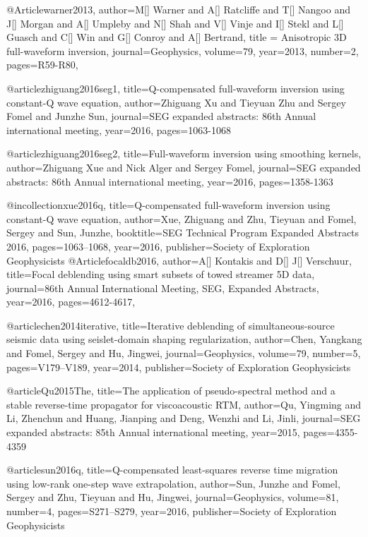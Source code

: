{@Article{warner2013,
  author={M[] Warner and A[] Ratcliffe and T[] Nangoo and J[] Morgan and A[] Umpleby and N[] Shah and V[] Vinje and I[] Stekl and L[] Guasch and C[] Win and G[] Conroy and A[] Bertrand},
  title = {Anisotropic 3{D} full-waveform inversion},
  journal={Geophysics},
  volume=79,
  year=2013,
  number=2,
  pages={R59-R80},
}


@article{zhiguang2016seg1,
  title={Q-compensated full-waveform inversion using constant-Q wave equation},
  author={Zhiguang Xu and Tieyuan Zhu and Sergey Fomel and Junzhe Sun},
  journal={SEG expanded abstracts: 86th Annual international meeting},
  year={2016},
  pages={1063-1068}
}

@article{zhiguang2016seg2,
  title={Full-waveform inversion using smoothing kernels},
  author={Zhiguang Xue and Nick Alger and Sergey Fomel},
  journal={SEG expanded abstracts: 86th Annual international meeting},
  year={2016},
  pages={1358-1363}
}

@incollection{xue2016q,
  title={Q-compensated full-waveform inversion using constant-Q wave equation},
  author={Xue, Zhiguang and Zhu, Tieyuan and Fomel, Sergey and Sun, Junzhe},
  booktitle={SEG Technical Program Expanded Abstracts 2016},
  pages={1063--1068},
  year={2016},
  publisher={Society of Exploration Geophysicists}
}
@Article{focaldb2016,
  author={A[] Kontakis and D[] J[] Verschuur},
  title={Focal deblending using smart subsets of towed streamer 5D data},
  journal={86th Annual International Meeting, SEG, Expanded Abstracts},
  year=2016,
  pages={4612-4617},
}

@article{chen2014iterative,
  title={Iterative deblending of simultaneous-source seismic data using seislet-domain shaping regularization},
  author={Chen, Yangkang and Fomel, Sergey and Hu, Jingwei},
  journal={Geophysics},
  volume={79},
  number={5},
  pages={V179--V189},
  year={2014},
  publisher={Society of Exploration Geophysicists}
}

@article{Qu2015The,
  title={The application of pseudo-spectral method and a stable reverse-time propagator for viscoacoustic {RTM}},
  author={Qu, Yingming and Li, Zhenchun and Huang, Jianping and Deng, Wenzhi and Li, Jinli},
  journal={SEG expanded abstracts: 85th Annual international meeting},
  year={2015},
  pages={4355-4359}
}

@article{sun2016q,
  title={Q-compensated least-squares reverse time migration using low-rank one-step wave extrapolation},
  author={Sun, Junzhe and Fomel, Sergey and Zhu, Tieyuan and Hu, Jingwei},
  journal={Geophysics},
  volume={81},
  number={4},
  pages={S271--S279},
  year={2016},
  publisher={Society of Exploration Geophysicists}
}

}
